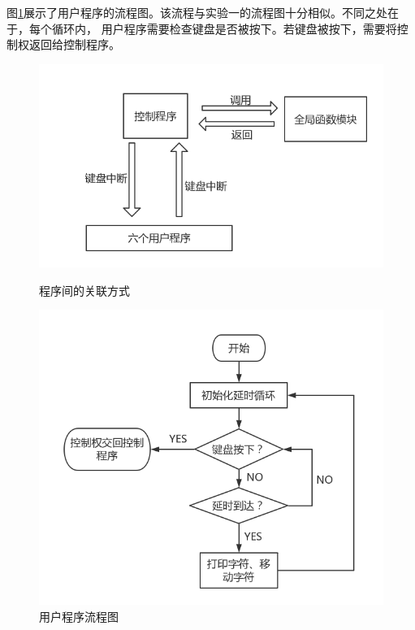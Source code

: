 \documentclass[a4paper]{article}
\begin{document}
    图\ref{fig:program}展示了用户程序的流程图。该流程与实验一的流程图十分相似。不同之处在于，每个循环内，
    用户程序需要检查键盘是否被按下。若键盘被按下，需要将控制权返回给控制程序。
    \begin{figure} 
    \begin{minipage}{0.48\textwidth}
     \centering
     \includegraphics[width=\linewidth]{assets/overview.png}
     \caption{程序间的关联方式}\label{fig:overview}
   \end{minipage}\hfill
   \begin {minipage}{0.48\textwidth}
     \centering
     \includegraphics[width=\linewidth]{assets/program.png}
     \caption{用户程序流程图}\label{fig:program}
    \end{minipage}
    \end{figure}
    
\end{document}

